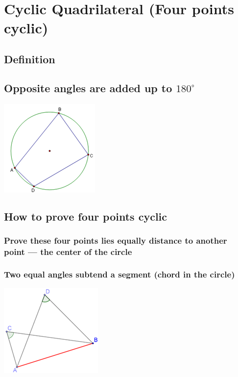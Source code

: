 \documentclass{article}
\begin{document}
\pagebreak

\section{Cyclic Quadrilateral (Four points cyclic)}

\subsection{Definition}

\vspace{20px}

\subsection{Opposite angles are added up to \(180^{\circ}\)}

\includegraphics[scale=.8]{Picture9.png}

\subsection{How to prove four points cyclic}

\subsubsection{Prove these four points lies equally distance to another point — the center of the circle}

\subsubsection{Two equal angles subtend a segment (chord in the circle)}

\includegraphics{Picture10.png}
\end{document}
